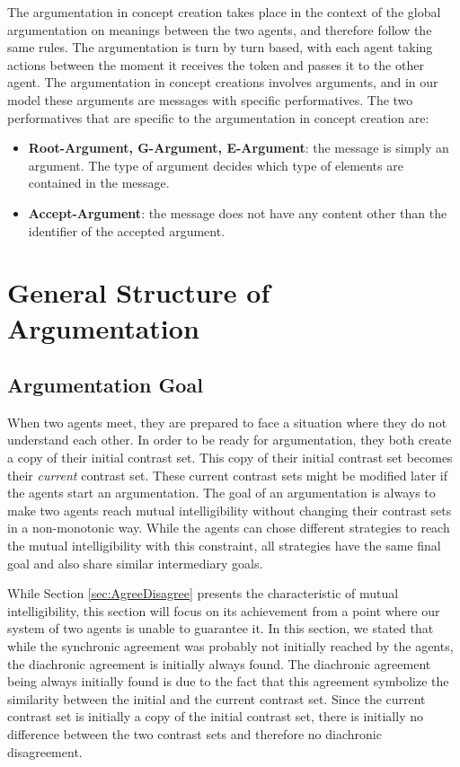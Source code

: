 The argumentation in concept creation takes place in the context of the global argumentation on meanings between the two agents, and therefore follow the same rules. The argumentation is turn by turn based, with each agent taking actions between the moment it receives the token and passes it to the other agent. The argumentation in concept creations involves arguments, and in our model these arguments are messages with specific performatives. The two performatives that are specific to the argumentation in concept creation are:

\begin{itemize}
    \item \textbf{Root-Argument, G-Argument, E-Argument}: the message is simply an argument. The type of argument decides which type of elements are contained in the message.
    \item \textbf{Accept-Argument}: the message does not have any content other than the identifier of the accepted argument.
\end{itemize}

\section{General Structure of Argumentation} 
\label{sec:ArgStruct}

\subsection{Argumentation Goal}
\label{sec:ArgumentationGoal}

When two agents meet, they are prepared to face a situation where they do not understand each other. In order to be ready for argumentation, they both create a copy of their initial contrast set. This copy of their initial contrast set becomes their \emph{current} contrast set. These current contrast sets might be modified later if the agents start an argumentation. The goal of an argumentation is always to make two agents reach mutual intelligibility without changing their contrast sets in a non-monotonic way. While the agents can chose different strategies to reach the mutual intelligibility with this constraint, all strategies have the same final goal and also share similar intermediary goals. 

While Section \ref{sec:AgreeDisagree} presents the characteristic of mutual intelligibility, this section will focus on its achievement from a point where our system of two agents is unable to guarantee it. In this section, we  stated that while the synchronic agreement was probably not initially reached by the agents, the diachronic agreement is initially always found. The diachronic agreement being always initially found is due to the fact that this agreement symbolize the similarity between the initial and the current contrast set. Since the current contrast set is initially a copy of the initial contrast set, there is initially no difference between the two contrast sets and therefore no diachronic disagreement.

